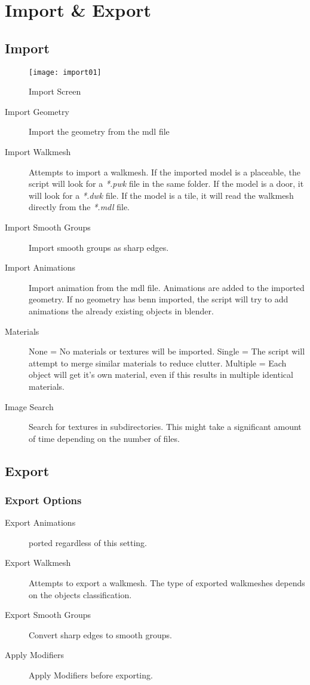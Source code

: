 \section{Import \& Export}

\subsection{Import}

\begin{figure}
  \centering
  \texttt{[image: import01]}
  \caption[mdl import]{Import Screen}
  \label{fig:import01}
\end{figure}

\begin{description}
    \item[Import Geometry] Import the geometry from the mdl file
    \item[Import Walkmesh] Attempts to import a walkmesh. If the imported model is a placeable, the script will look for a {\textit{*.pwk}} file in the same folder. If the model is a door, it will look for a {\textit{*.dwk}} file. If the model is a tile, it will read the walkmesh directly from the {\textit{*.mdl}} file.
    \item[Import Smooth Groups] Import smooth groups as sharp edges.
    \item[Import Animations] Import animation from the mdl file. Animations are added to the imported geometry. If no geometry has benn imported, the script will try to add animations the already existing objects in blender.
    \item[Materials] None = No materials or textures will be imported. Single = The script will attempt to merge similar materials to reduce clutter. Multiple = Each object will get it's own material, even if this results in multiple identical materials.
    \item[Image Search] Search for textures in subdirectories. This might take a significant amount of time depending on the number of files.
\end{description}


\subsection{Export}

\subsubsection*{Export Options}
\begin{description}
    \item[Export Animations] ported regardless of this setting.
    \item[Export Walkmesh] Attempts to export a walkmesh. The type of exported walkmeshes depends on the objects classification.
    \item[Export Smooth Groups] Convert sharp edges to smooth groups.
    \item[Apply Modifiers] Apply Modifiers before exporting.
\end{description}
